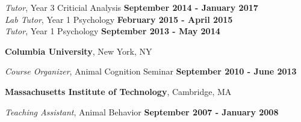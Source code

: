 \documentclass[margin,line]{res}
\begin{document}
\begin{resume}
\vspace{-.4cm}
{\em Tutor}, Year 3 Criticial Analysis \hfill {\bf September 2014 - January 2017}\\

\vspace{-.4cm}
{\em Lab Tutor}, Year 1 Psychology \hfill {\bf February 2015 - April 2015}\\

\vspace{-.4cm}
{\em Tutor}, Year 1 Psychology \hfill {\bf September 2013 - May 2014}\\
\vspace{-.3cm}


{\bf Columbia University}, New York, NY

\vspace{-.2cm}
{\em Course Organizer}, Animal Cognition Seminar \hfill {\bf September 2010 - June 2013}\\
\vspace{-.5cm}


{\bf Massachusetts Institute of Technology}, Cambridge, MA

\vspace{-.2cm}
{\em Teaching Assistant}, Animal Behavior \hfill {\bf September 2007 - January 2008}\\
\vspace{-.5cm}




\vspace{.5cm}



\end{resume}
\end{document}
